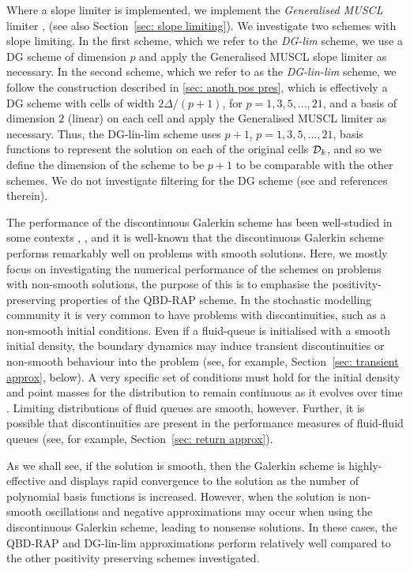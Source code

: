 Where a slope limiter is implemented, we implement the \emph{Generalised MUSCL} limiter \citep{c99}, \citep[Section~5.6.2]{nodalDGBook} (see also Section~\ref{sec: slope limiting}). We investigate two schemes with slope limiting. In the first scheme, which we refer to the \emph{DG-lim} scheme, we use a DG scheme of dimension \(p\) and apply the Generalised MUSCL slope limiter as necessary. In the second scheme, which we refer to as the \emph{DG-lin-lim} scheme, we follow the construction described in \ref{sec: anoth pos pres}, which is effectively a DG scheme with cells of width \(2\Delta/(p+1)\), for \(p=1,3,5,...,21\), and a basis of dimension \(2\) (linear) on each cell and apply the Generalised MUSCL limiter as necessary. Thus, the DG-lin-lim scheme uses \(p+1\), \(p=1,3,5,...,21\), basis functions to represent the solution on each of the original cells \(\mathcal{D}_k\), and so we define the dimension of the scheme to be \(p+1\) to be comparable with the other schemes. We do not investigate filtering for the DG scheme (see \citep[Section~5.6.1]{nodalDGBook} and references therein).

The performance of the discontinuous Galerkin scheme has been well-studied in some contexts \cite{c99}, \cite[Section~5.5]{nodalDGBook}, and it is well-known that the discontinuous Galerkin scheme performs remarkably well on problems with smooth solutions. Here, we mostly focus on investigating the numerical performance of the schemes on problems with non-smooth solutions, the purpose of this is to emphasise the positivity-preserving properties of the QBD-RAP scheme. In the stochastic modelling community it is very common to have problems with discontinuities, such as a non-smooth initial conditions. Even if a fluid-queue is initialised with a smooth initial density, the boundary dynamics may induce transient discontinuities or non-smooth behaviour into the problem (see, for example, Section~\ref{sec: transient approx}, below). A very specific set of conditions must hold for the initial density and point masses for the distribution to remain continuous as it evolves over time \citep{bo2014,bop2020}. Limiting distributions of fluid queues are smooth, however. Further, it is possible that discontinuities are present in the performance measures of fluid-fluid queues (see, for example, Section~\ref{sec: return approx}). 

As we shall see, if the solution is smooth, then the Galerkin scheme is highly-effective and displays rapid convergence to the solution as the number of polynomial basis functions is increased. However, when the solution is non-smooth oscillations and negative approximations may occur when using the discontinuous Galerkin scheme, leading to nonsense solutions. In these cases, the QBD-RAP and DG-lin-lim approximations perform relatively well compared to the other positivity preserving schemes investigated. 


